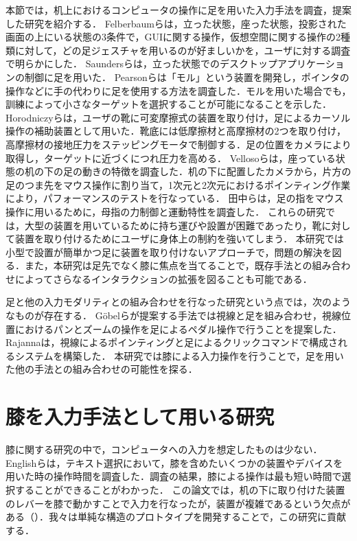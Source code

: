 本節では，机上におけるコンピュータの操作に足を用いた入力手法を調査，提案した研究を紹介する．
Felberbaumら\cite{Felberbaum:2018:BUF:3173574.3173908}は，立った状態，座った状態，投影された画面の上にいる状態の3条件で，GUIに関する操作，仮想空間に関する操作の2種類に対して，どの足ジェスチャを用いるのが好ましいかを，ユーザに対する調査で明らかにした．
Saundersら\cite{Saunders:2016:TFI:2901790.2901815}は，立った状態でのデスクトップアプリケーションの制御に足を用いた．
Pearsonら\cite{Pearson:1986:MMD:22627.22392, Pearson:1988:EET:49108.1046356}は「モル」という装置を開発し，ポインタの操作などに手の代わりに足を使用する方法を調査した．モルを用いた場合でも，訓練によって小さなターゲットを選択することが可能になることを示した．
Horodniczyら\cite{Horodniczy:2017:FHE:3025453.3025625}は，ユーザの靴に可変摩擦式の装置を取り付け，足によるカーソル操作の補助装置として用いた．靴底には低摩擦材と高摩擦材の2つを取り付け，高摩擦材の接地圧力をステッピングモータで制御する．足の位置をカメラにより取得し，ターゲットに近づくにつれ圧力を高める．
Vellosoら\cite{velloso:hal-01599657}は，座っている状態の机の下の足の動きの特徴を調査した．机の下に配置したカメラから，片方の足のつま先をマウス操作に割り当て，1次元と2次元におけるポインティング作業により，パフォーマンスのテストを行なっている．
田中ら\cite{110004704997}は，足の指をマウス操作に用いるために，母指の力制御と運動特性を調査した．
これらの研究では，大型の装置を用いているために持ち運びや設置が困難であったり，靴に対して装置を取り付けるためにユーザに身体上の制約を強いてしまう．
本研究では小型で設置が簡単かつ足に装置を取り付けないアプローチで，問題の解決を図る．また，本研究は足先でなく膝に焦点を当てることで，既存手法との組み合わせによってさらなるインタラクションの拡張を図ることも可能である．

足と他の入力モダリティとの組み合わせを行なった研究という点では，次のようなものが存在する．
G\"{o}belら\cite{Gobel:2013:GFI:2468356.2479610}が提案する手法では視線と足を組み合わせ，視線位置におけるパンとズームの操作を足によるペダル操作で行うことを提案した．
Rajanna\cite{Rajanna:2016:GFI:2876456.2876462}は，視線によるポインティングと足によるクリックコマンドで構成されるシステムを構築した．
本研究では膝による入力操作を行うことで，足を用いた他の手法との組み合わせの可能性を探る．

\section{膝を入力手法として用いる研究}
膝に関する研究の中で，コンピュータへの入力を想定したものは少ない．
Englishら\cite{1698228}は，テキスト選択において，膝を含めたいくつかの装置やデバイスを用いた時の操作時間を調査した．調査の結果，膝による操作は最も短い時間で選択することができることがわかった．
この論文では，机の下に取り付けた装置のレバーを膝で動かすことで入力を行なったが，装置が複雑であるという欠点がある（）．我々は単純な構造のプロトタイプを開発することで，この研究に貢献する．




